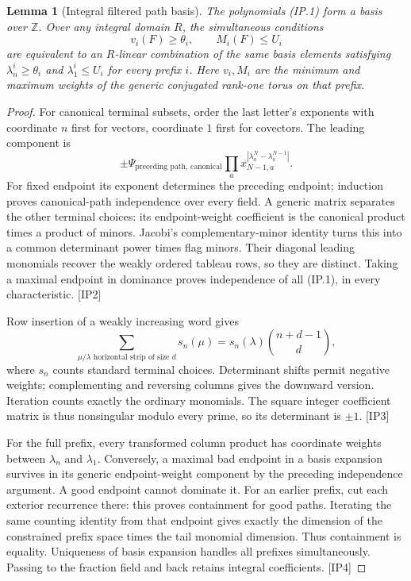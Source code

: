 \documentclass[11pt,a4paper]{article}
\numberwithin{equation}{section}
\newtheorem{lemma}[theorem]{Lemma}
\theoremstyle{remark}\newtheorem{remark}[theorem]{Remark}
\begin{document}
\begin{lemma}[Integral filtered path basis]
The polynomials (IP.1) form a basis over $\mathbb Z$. Over any integral domain $R$, the simultaneous conditions
\[
 v_i(F)\ge\theta_i,\qquad M_i(F)\le U_i
 \tag{IP.2}
\]
are equivalent to an $R$-linear combination of the same basis elements satisfying $\lambda^i_n\ge\theta_i$ and $\lambda^i_1\le U_i$ for every prefix $i$. Here $v_i,M_i$ are the minimum and maximum weights of the generic conjugated rank-one torus on that prefix.
\end{lemma}
\begin{proof}
For canonical terminal subsets, order the last letter's exponents with coordinate $n$ first for vectors, coordinate $1$ first for covectors. The leading component is
\[
 \pm\Psi_{\text{preceding path, canonical}}
       \prod_a x_{N-1,a}^{|\lambda^N_a-\lambda^{N-1}_a|}.
\]
For fixed endpoint its exponent determines the preceding endpoint; induction proves canonical-path independence over every field. A generic matrix separates the other terminal choices: its endpoint-weight coefficient is the canonical product times a product of minors. Jacobi's complementary-minor identity turns this into a common determinant power times flag minors. Their diagonal leading monomials recover the weakly ordered tableau rows, so they are distinct. Taking a maximal endpoint in dominance proves independence of all (IP.1), in every characteristic. \textsf{[IP2]}

Row insertion of a weakly increasing word gives
\[
 \sum_{\mu/\lambda\text{ horizontal strip of size }d}s_n(\mu)
   =s_n(\lambda)\binom{n+d-1}{d},
\]
where $s_n$ counts standard terminal choices. Determinant shifts permit negative weights; complementing and reversing columns gives the downward version. Iteration counts exactly the ordinary monomials. The square integer coefficient matrix is thus nonsingular modulo every prime, so its determinant is $\pm1$. \textsf{[IP3]}

For the full prefix, every transformed column product has coordinate weights between $\lambda_n$ and $\lambda_1$. Conversely, a maximal bad endpoint in a basis expansion survives in its generic endpoint-weight component by the preceding independence argument. A good endpoint cannot dominate it. For an earlier prefix, cut each exterior recurrence there: this proves containment for good paths. Iterating the same counting identity from that endpoint gives exactly the dimension of the constrained prefix space times the tail monomial dimension. Thus containment is equality. Uniqueness of basis expansion handles all prefixes simultaneously. Passing to the fraction field and back retains integral coefficients. \textsf{[IP4]}
\end{proof}
\end{document}
